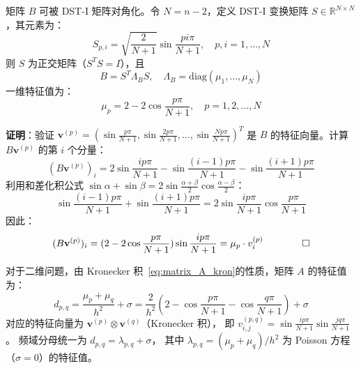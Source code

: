 \begin{theorem}
  \label{thm:eigenvalues}
  矩阵 $B$ 可被 DST-I 矩阵对角化。令 $N = n-2$，定义 DST-I 变换矩阵
  $S \in \mathbb{R}^{N \times N}$，其元素为：
  \begin{equation}
    S_{p,i} = \sqrt{\frac{2}{N+1}} \sin\frac{p i \pi}{N+1}, \quad p,i = 1, \ldots, N
  \end{equation}
  则 $S$ 为正交矩阵（$S^T S = I$），且
  \begin{equation}
    B = S^T \Lambda_B S, \quad \Lambda_B = \mathrm{diag}(\mu_1, \ldots, \mu_N)
  \end{equation}
  一维特征值为：
  \begin{equation}
    \mu_p = 2 - 2\cos\frac{p\pi}{N+1}, \quad p = 1, 2, \ldots, N
    \label{eq:mu_p}
  \end{equation}

  \textbf{证明}：验证 $\mathbf{v}^{(p)} = (\sin\frac{p\pi}{N+1}, \sin\frac{2p\pi}{N+1}, \ldots, \sin\frac{Np\pi}{N+1})^T$
  是 $B$ 的特征向量。计算 $B\mathbf{v}^{(p)}$ 的第 $i$ 个分量：
  \begin{equation}
    (B\mathbf{v}^{(p)})_i = 2\sin\frac{ip\pi}{N+1} - \sin\frac{(i-1)p\pi}{N+1} - \sin\frac{(i+1)p\pi}{N+1}
  \end{equation}
  利用和差化积公式 $\sin\alpha + \sin\beta = 2\sin\frac{\alpha+\beta}{2}\cos\frac{\alpha-\beta}{2}$：
  \begin{equation}
    \sin\frac{(i-1)p\pi}{N+1} + \sin\frac{(i+1)p\pi}{N+1}
    = 2\sin\frac{ip\pi}{N+1}\cos\frac{p\pi}{N+1}
  \end{equation}
  因此：
  \begin{equation}
    (B\mathbf{v}^{(p)})_i = (2 - 2\cos\frac{p\pi}{N+1})\sin\frac{ip\pi}{N+1}
    = \mu_p \cdot v_i^{(p)} \qquad \qed
  \end{equation}
\end{theorem}

对于二维问题，由 Kronecker 积~\eqref{eq:matrix_A_kron}的性质，矩阵 $A$ 的特征值为：
\begin{equation}
  d_{p,q} = \frac{\mu_p + \mu_q}{h^2} + \sigma
  = \frac{2}{h^2}\left(2 - \cos\frac{p\pi}{N+1} - \cos\frac{q\pi}{N+1}\right) + \sigma
  \label{eq:2d_eigenvalue}
\end{equation}
对应的特征向量为 $\mathbf{v}^{(p)} \otimes \mathbf{v}^{(q)}$（Kronecker 积），
即 $v_{i,j}^{(p,q)} = \sin\frac{ip\pi}{N+1}\sin\frac{jq\pi}{N+1}$。
频域分母统一为 $d_{p,q} = \lambda_{p,q} + \sigma$，
其中 $\lambda_{p,q} = (\mu_p+\mu_q)/h^2$ 为 Poisson 方程（$\sigma=0$）的特征值。

